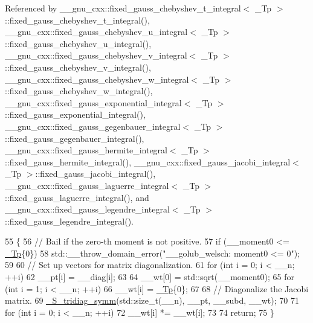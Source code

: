 Referenced by \+\_\+\+\_\+gnu\+\_\+cxx\+::fixed\+\_\+gauss\+\_\+chebyshev\+\_\+t\+\_\+integral$<$ \+\_\+\+Tp $>$\+::fixed\+\_\+gauss\+\_\+chebyshev\+\_\+t\+\_\+integral(), \+\_\+\+\_\+gnu\+\_\+cxx\+::fixed\+\_\+gauss\+\_\+chebyshev\+\_\+u\+\_\+integral$<$ \+\_\+\+Tp $>$\+::fixed\+\_\+gauss\+\_\+chebyshev\+\_\+u\+\_\+integral(), \+\_\+\+\_\+gnu\+\_\+cxx\+::fixed\+\_\+gauss\+\_\+chebyshev\+\_\+v\+\_\+integral$<$ \+\_\+\+Tp $>$\+::fixed\+\_\+gauss\+\_\+chebyshev\+\_\+v\+\_\+integral(), \+\_\+\+\_\+gnu\+\_\+cxx\+::fixed\+\_\+gauss\+\_\+chebyshev\+\_\+w\+\_\+integral$<$ \+\_\+\+Tp $>$\+::fixed\+\_\+gauss\+\_\+chebyshev\+\_\+w\+\_\+integral(), \+\_\+\+\_\+gnu\+\_\+cxx\+::fixed\+\_\+gauss\+\_\+exponential\+\_\+integral$<$ \+\_\+\+Tp $>$\+::fixed\+\_\+gauss\+\_\+exponential\+\_\+integral(), \+\_\+\+\_\+gnu\+\_\+cxx\+::fixed\+\_\+gauss\+\_\+gegenbauer\+\_\+integral$<$ \+\_\+\+Tp $>$\+::fixed\+\_\+gauss\+\_\+gegenbauer\+\_\+integral(), \+\_\+\+\_\+gnu\+\_\+cxx\+::fixed\+\_\+gauss\+\_\+hermite\+\_\+integral$<$ \+\_\+\+Tp $>$\+::fixed\+\_\+gauss\+\_\+hermite\+\_\+integral(), \+\_\+\+\_\+gnu\+\_\+cxx\+::fixed\+\_\+gauss\+\_\+jacobi\+\_\+integral$<$ \+\_\+\+Tp $>$\+::fixed\+\_\+gauss\+\_\+jacobi\+\_\+integral(), \+\_\+\+\_\+gnu\+\_\+cxx\+::fixed\+\_\+gauss\+\_\+laguerre\+\_\+integral$<$ \+\_\+\+Tp $>$\+::fixed\+\_\+gauss\+\_\+laguerre\+\_\+integral(), and \+\_\+\+\_\+gnu\+\_\+cxx\+::fixed\+\_\+gauss\+\_\+legendre\+\_\+integral$<$ \+\_\+\+Tp $>$\+::fixed\+\_\+gauss\+\_\+legendre\+\_\+integral().


\begin{DoxyCode}
55     \{
56       \textcolor{comment}{// Bail if the zero-th moment is not positive.}
57       \textcolor{keywordflow}{if} (\_\_moment0 <= \hyperlink{namespace____gnu__cxx_a3b19a9c800ca194374ef9172290f7d79}{\_Tp}\{0\})
58         std::\_\_throw\_domain\_error(\textcolor{stringliteral}{"\_\_golub\_welsch: moment0 <= 0"});
59 
60       \textcolor{comment}{// Set up vectors for matrix diagonalization.}
61       \textcolor{keywordflow}{for} (\textcolor{keywordtype}{int} i = 0; i < \_\_n; ++i)
62         \_\_pt[i] = \_\_diag[i];
63 
64       \_\_wt[0] = std::sqrt(\_\_moment0);
65       \textcolor{keywordflow}{for} (\textcolor{keywordtype}{int} i = 1; i < \_\_n; ++i)
66         \_\_wt[i] = \hyperlink{namespace____gnu__cxx_a3b19a9c800ca194374ef9172290f7d79}{\_Tp}\{0\};
67 
68       \textcolor{comment}{// Diagonalize the Jacobi matrix.}
69       \hyperlink{namespace____gnu__cxx_a4b9501d94b3eebf5f1ffe990b81cae93}{\_S\_tridiag\_symm}(std::size\_t(\_\_n), \_\_pt, \_\_subd, \_\_wt);
70 
71       \textcolor{keywordflow}{for} (\textcolor{keywordtype}{int} i = 0; i < \_\_n; ++i)
72         \_\_wt[i] *= \_\_wt[i];
73 
74       \textcolor{keywordflow}{return};
75     \}
\end{DoxyCode}
